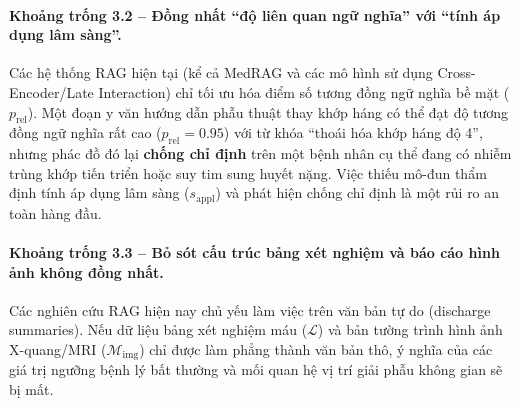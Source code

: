 \paragraph{Khoảng trống 3.2 -- Đồng nhất ``độ liên quan ngữ nghĩa'' với ``tính áp dụng lâm sàng''.}
Các hệ thống RAG hiện tại (kể cả MedRAG và các mô hình sử dụng Cross-Encoder/Late Interaction) chỉ tối ưu hóa điểm số tương đồng ngữ nghĩa bề mặt ($p_{\mathrm{rel}}$). Một đoạn y văn hướng dẫn phẫu thuật thay khớp háng có thể đạt độ tương đồng ngữ nghĩa rất cao ($p_{\mathrm{rel}} = 0.95$) với từ khóa ``thoái hóa khớp háng độ 4'', nhưng phác đồ đó lại \textbf{chống chỉ định} trên một bệnh nhân cụ thể đang có nhiễm trùng khớp tiến triển hoặc suy tim sung huyết nặng. Việc thiếu mô-đun thẩm định tính áp dụng lâm sàng ($s_{\mathrm{appl}}$) và phát hiện chống chỉ định là một rủi ro an toàn hàng đầu.

\paragraph{Khoảng trống 3.3 -- Bỏ sót cấu trúc bảng xét nghiệm và báo cáo hình ảnh không đồng nhất.}
Các nghiên cứu RAG hiện nay chủ yếu làm việc trên văn bản tự do (discharge summaries). Nếu dữ liệu bảng xét nghiệm máu ($\mathcal{L}$) và bản tường trình hình ảnh X-quang/MRI ($\mathcal{M}_{\mathrm{img}}$) chỉ được làm phẳng thành văn bản thô, ý nghĩa của các giá trị ngưỡng bệnh lý bất thường và mối quan hệ vị trí giải phẫu không gian sẽ bị mất.
